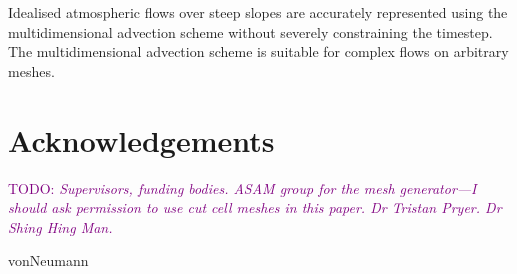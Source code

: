 \documentclass{article}
\newcommand{\TODO}[1]{\textcolor{purple}{TODO: \emph{#1}}}
\begin{document}
Idealised atmospheric flows over steep slopes are accurately represented using the multidimensional advection scheme without severely constraining the timestep.  The multidimensional advection scheme is suitable for complex flows on arbitrary meshes.

\section{Acknowledgements}
\TODO{Supervisors, funding bodies.  ASAM group for the mesh generator---I should ask permission to use cut cell meshes in this paper.  Dr Tristan Pryer.  Dr Shing Hing Man.}




 {vonNeumann}
\end{document}
